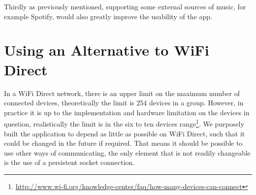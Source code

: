 Thirdly as previously mentioned, supporting some external sources of music, for example Spotify, would also greatly improve the usability of the app.

\section{Using an Alternative to WiFi Direct}
In a WiFi Direct network, there is an upper limit on the maximum number of connected devices, theoretically the limit is 254 devices in a group.
However, in practice it is up to the implementation and hardware limitation on the devices in question, realistically the limit is in the six to ten devices range\footnote{\url{http://www.wi-fi.org/knowledge-center/faq/how-many-devices-can-connect}}.
We purposely built the application to depend as little as possible on WiFi Direct, such that it could be changed in the future if required.
That means it should be possible to use other ways of communicating, the only element that is not readily changeable is the use of a persistent socket connection.

